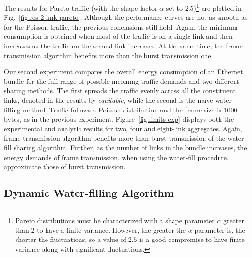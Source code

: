 \documentclass[journal,english,twocolumn,10pt,letterpaper]{IEEEtran}
\newcommand{\added}[1]{{#1}}
\newcommand{\addedfragile}[1]{{#1}}
\begin{document}
\begin{figure*}
  \centering
  \caption{\addedfragile
    {Results} for a 2-link bundle with Pareto traffic as a
    function of excess traffic load on the second link. Theoretical values
    omitted, as there is no closed form formula for Pareto
    arrivals~\cite{herreria12:_gi_g_model_gb_energ_effic_ether}.}
  \label{fig:res-2-link-pareto}
\end{figure*}
The results for Pareto traffic (with the shape factor $\alpha$ set to
$2.5$)\footnote{Pareto distributions must be characterized with a shape
  parameter $\alpha$ greater than 2 to have a finite variance. However, the
  greater the $\alpha$ parameter is, the shorter the fluctuations, so a value
  of $2.5$ is a good compromise to have finite variance along with significant
  fluctuations.} are plotted in \added{Fig.}~\ref{fig:res-2-link-pareto}. Although
the performance curves are not as smooth as for the Poisson traffic, the
previous conclusions still hold. Again, the minimum consumption is obtained
when most of the traffic is on a single link and then increases as the traffic
on the second link increases. At the same time, the frame transmission
algorithm benefits more than the burst transmission one.

Our second experiment compares the overall energy consumption of an Ethernet
bundle for the full range of possible incoming traffic demands and two
different sharing methods. The first spreads the traffic evenly across all the
constituent links, denoted in the results by \emph{equitable,} while the
second is the naïve water-filling method. Traffic follows a Poisson
distribution and the frame size is 1000$\,$bytes, as in the previous
experiment. Figure~\ref{fig:limits-exp} displays both the experimental and
analytic results for two, four and eight-link aggregates. Again, frame
transmission algorithm benefits more than burst transmission of the water-fill
sharing algorithm. Further, as the number of links in the bundle increases,
the energy demands of frame transmission, when using the water-fill procedure,
approximate those of burst transmission.


\subsection{Dynamic Water-filling Algorithm}
\label{sec:dynam-water-fill}
\end{document}
